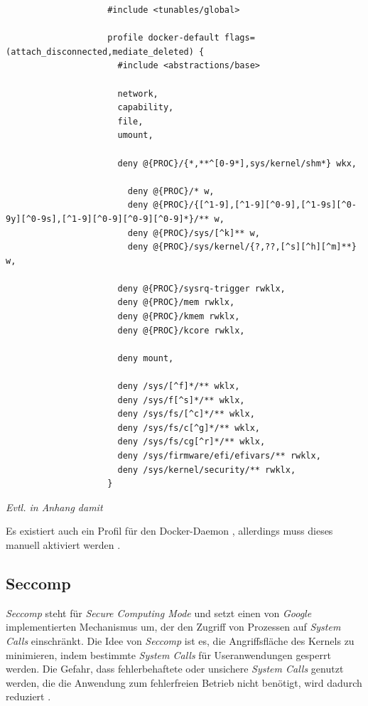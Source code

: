 \documentclass[../main.tex]{subfiles}
\begin{document}
				\begin{lstlisting}
					#include <tunables/global>

					profile docker-default flags=(attach_disconnected,mediate_deleted) {
					  #include <abstractions/base>

					  network,
					  capability,
					  file,
					  umount,

					  deny @{PROC}/{*,**^[0-9*],sys/kernel/shm*} wkx,

						deny @{PROC}/* w,
						deny @{PROC}/{[^1-9],[^1-9][^0-9],[^1-9s][^0-9y][^0-9s],[^1-9][^0-9][^0-9][^0-9]*}/** w,
						deny @{PROC}/sys/[^k]** w,
						deny @{PROC}/sys/kernel/{?,??,[^s][^h][^m]**} w,

					  deny @{PROC}/sysrq-trigger rwklx,
					  deny @{PROC}/mem rwklx,
					  deny @{PROC}/kmem rwklx,
					  deny @{PROC}/kcore rwklx,

					  deny mount,

					  deny /sys/[^f]*/** wklx,
					  deny /sys/f[^s]*/** wklx,
					  deny /sys/fs/[^c]*/** wklx,
					  deny /sys/fs/c[^g]*/** wklx,
					  deny /sys/fs/cg[^r]*/** wklx,
					  deny /sys/firmware/efi/efivars/** rwklx,
					  deny /sys/kernel/security/** rwklx,
					}
				\end{lstlisting}
				\emph{Evtl. in Anhang damit}

				Es existiert auch ein Profil für den Docker-Daemon \cite{githubAppArmorProfileDaemon}, allerdings muss dieses manuell aktiviert werden \cite{githubAppArmorDoc}.

    \subsection{Seccomp}
		\label{seccomp}

			\emph{Seccomp} steht für \emph{Secure Computing Mode} und setzt einen von \emph{Google} implementierten Mechanismus um, der den Zugriff von Prozessen auf \emph{System Calls} einschränkt. Die Idee von \emph{Seccomp} ist es, die Angriffsfläche des Kernels zu minimieren, indem bestimmte \emph{System Calls} für Useranwendungen gesperrt werden. Die Gefahr, dass fehlerbehaftete oder unsichere \emph{System Calls} genutzt werden, die die Anwendung zum fehlerfreien Betrieb nicht benötigt, wird dadurch reduziert \cite{linuxSecOverview}\cite{seccompGitDesc}\cite{secInFuture}.
\end{document}
